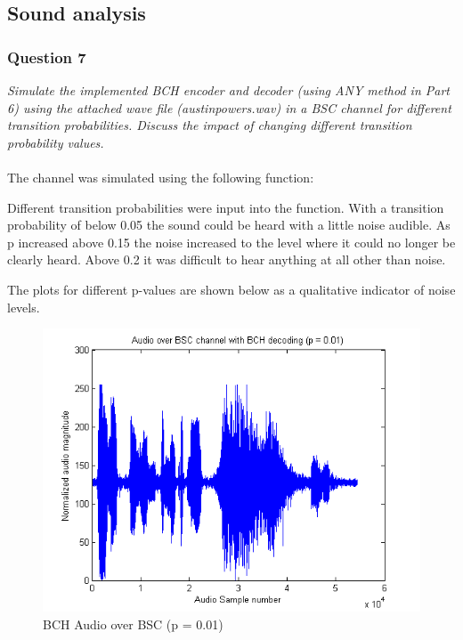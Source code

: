 \documentclass[a4paper]{article}
\begin{document}


\subsection{Sound analysis}

\subsubsection{Question 7} \textit{Simulate the implemented BCH encoder and decoder (using ANY method in Part 6) using the attached wave file (austinpowers.wav) in a BSC channel for different transition probabilities. Discuss the impact of changing different transition probability values.}\\
\\
The channel was simulated using the following function:




Different transition probabilities were input into the function. With a transition probability of below 0.05 the sound could be heard with a little noise audible. As p increased above 0.15 the noise increased to the level where it could no longer be clearly heard. Above 0.2 it was difficult to hear anything at all other than noise.

The plots for different p-values are shown below as a qualitative indicator of noise levels.

\begin{figure}[hbtp]
\centering
\includegraphics[scale=0.5]{plots/audio_over_bsc_bch_p_001.png}
\caption{BCH Audio over BSC (p = 0.01)}
\end{figure}
\end{document}

